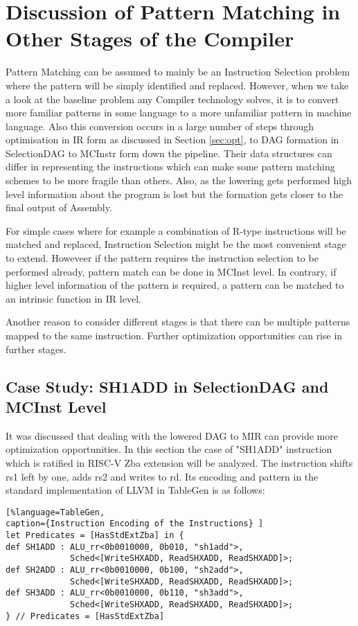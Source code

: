 \section{Discussion of Pattern Matching in Other Stages of the Compiler}
Pattern Matching can be assumed to mainly be an Instruction Selection problem where the pattern will be simply identified and replaced. However, when we take a look at the baseline problem any Compiler technology solves, it is to convert more familiar patterns in some language to a more unfamiliar pattern in machine language. Also this conversion occurs in a large number of steps through optimisation in IR form as discussed in Section \ref{sec:opt}, to DAG formation in SelectionDAG to MCInstr form down the pipeline. Their data structures can differ in representing the instructions which can make some pattern matching schemes to be more fragile than others. Also, as the lowering gets performed high level information about the program is lost but the formation gets closer to the final output of Assembly. 

For simple cases where for example a combination of R-type instructions will be matched and replaced, Instruction Selection might be the most convenient stage to extend. Howeveer if the pattern requires the instruction selection to be performed already, pattern match can be done in MCInst level. In contrary, if higher level information of the pattern is required, a pattern can be matched to an intrinsic function in IR level. 

Another reason to consider different stages is that there can be multiple patterns mapped to the same instruction. Further optimization opportunities can rise in further stages. 

\subsection{Case Study: SH1ADD in SelectionDAG and MCInst Level}

It was discussed that dealing with the lowered DAG to MIR can provide more optimization opportunities. In this section the case of "SH1ADD" instruction which is ratified in RISC-V Zba extension will be analyzed. The instruction shifts rs1 left by one, adds rs2 and writes to rd. Its encoding and pattern in the standard implementation of LLVM in TableGen is as follows:

\begin{lstlisting}[%language=TableGen,
caption={Instruction Encoding of the Instructions} ]
let Predicates = [HasStdExtZba] in {
def SH1ADD : ALU_rr<0b0010000, 0b010, "sh1add">,
             Sched<[WriteSHXADD, ReadSHXADD, ReadSHXADD]>;
def SH2ADD : ALU_rr<0b0010000, 0b100, "sh2add">,
             Sched<[WriteSHXADD, ReadSHXADD, ReadSHXADD]>;
def SH3ADD : ALU_rr<0b0010000, 0b110, "sh3add">,
             Sched<[WriteSHXADD, ReadSHXADD, ReadSHXADD]>;
} // Predicates = [HasStdExtZba]
\end{lstlisting}

